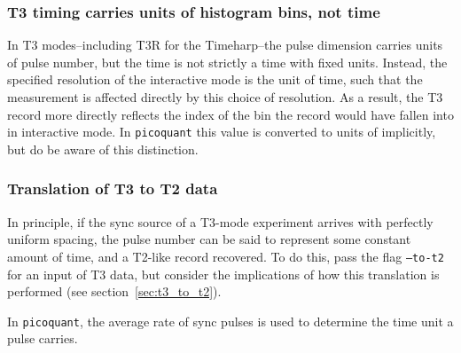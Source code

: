 \documentclass{article}
\newcommand{\picoquant}{\texttt{picoquant}}
\begin{document}
\subsubsection{T3 timing carries units of histogram bins, not time}
In T3 modes--including T3R for the Timeharp--the pulse dimension carries units of pulse number, but the time is not strictly a time with fixed units. Instead, the specified resolution of the interactive mode is the unit of time, such that the measurement is affected directly by this choice of resolution. As a result, the T3 record more directly reflects the index of the bin the record would have fallen into in interactive mode. In \picoquant{} this value is converted to units of \pico\second{} implicitly, but do be aware of this distinction.

\subsubsection{Translation of T3 to T2 data}
In principle, if the sync source of a T3-mode experiment arrives with perfectly uniform spacing, the pulse number can be said to represent some constant amount of time, and a T2-like record recovered. To do this, pass the flag \texttt{--to-t2} for an input of T3 data, but consider the implications of how this translation is performed (see section~\ref{sec:t3_to_t2}). 

In \picoquant, the average rate of sync pulses is used to determine the time unit a pulse carries.

%
%
\end{document}
